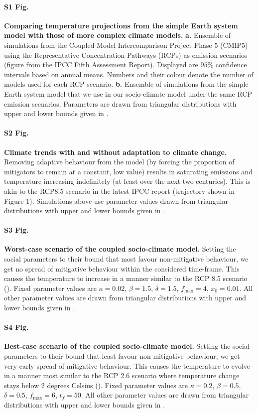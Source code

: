 \documentclass[10pt,letterpaper]{article}
\begin{document}
\paragraph*{S1 Fig.}
\label{S1_fig}
\textbf{Comparing temperature projections from the simple Earth system model with those of more complex climate models.} \textbf{a.} Ensemble of simulations from the Coupled Model Intercomparison Project Phase 5 (CMIP5) using the Representative Concentration Pathways (RCPs) as emission scenarios (figure from the IPCC Fifth Assessment Report\cite{ipcc13}). Displayed are $95\%$ confidence intervals based on annual means. Numbers and their colour denote the number of models used for each RCP scenario. \textbf{b.} Ensemble of simulations from the simple Earth system model that we use in our socio-climate model under the same RCP emission scenarios. Parameters are drawn from triangular distributions with upper and lower bounds given in .

\paragraph*{S2 Fig.}
\label{S2_fig}
\textbf{Climate trends with and without adaptation to climate change.} Removing adaptive behaviour from the model (by forcing the proportion of mitigators to remain at a constant, low value) results in saturating emissions and temperature increasing indefinitely (at least over the next two centuries). This is akin to the RCP8.5 scenario in the latest IPCC report (trajectory shown in Figure 1). Simulations above use parameter values drawn from triangular distributions with upper and lower bounds given in .

\paragraph*{S3 Fig.}
\label{S3_fig}
\textbf{Worst-case scenario of the coupled socio-climate model.} Setting the social parameters to their bound that most favour non-mitigative behaviour, we get no spread of mitigative behaviour within the considered time-frame. This causes the temperature to increase in a manner similar to the RCP 8.5 scenario (). Fixed parameter values are $\kappa = 0.02$, $\beta=1.5$, $\delta=1.5$, $f_{\text{max}}=4$, $x_0=0.01$. All other parameter values are drawn from triangular distributions with upper and lower bounds given in .

\paragraph*{S4 Fig.}
\label{S4_fig}
\textbf{Best-case scenario of the coupled socio-climate model.} Setting the social parameters to their bound that least favour non-mitigative behaviour, we get very early spread of mitigative behaviour. This causes the temperature to evolve in a manner most similar to the RCP 2.6 scenario where temperature change stays below 2 degrees Celsius (). Fixed parameter values are $\kappa = 0.2$, $\beta=0.5$, $\delta=0.5$, $f_{\text{max}}=6$, $t_f=50$. All other parameter values are drawn from triangular distributions with upper and lower bounds given in .
\end{document}
